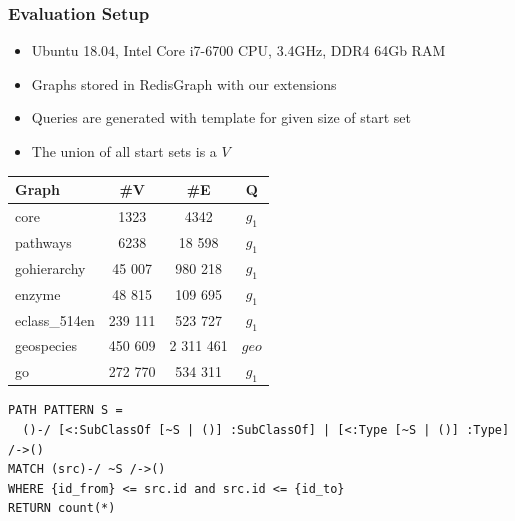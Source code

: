 \documentclass[xcolor=table,aspectratio=169]{beamer}
\begin{document}
\begin{frame}[fragile] \frametitle{Evaluation Setup}

\begin{minipage}[t]{0.51\textwidth}
\vspace{-2cm}
\begin{itemize}
  \item Ubuntu 18.04, Intel Core i7-6700 CPU, 3.4GHz, DDR4 64Gb RAM
  \item Graphs stored in RedisGraph with our extensions
  \item Queries are generated with template for given size of start set
  \item The union of all start sets is a $V$ 
\end{itemize}

\end{minipage}
\begin{minipage}[t]{0.44\textwidth}
{
\begin{tabular}{|l|c|c|c|}
\hline
Graph                  & \#V                  & \#E                  & Q     \\
              
\hline
\hline
core                   & 1323                 & 4342                 & $g_1$ \\
pathways               & 6238                 & 18 598               & $g_1$ \\
gohierarchy            & 45 007               & 980 218              & $g_1$ \\
enzyme                 & 48 815               & 109 695              & $g_1$ \\
eclass\_514en          & 239 111              & 523 727              & $g_1$ \\
geospecies             & 450 609              & 2 311 461            & $geo$ \\
go                     & 272 770              & 534 311              & $g_1$ \\
\hline
\end{tabular}
}

\end{minipage}

\vspace{1cm}

\begin{verbatim}
PATH PATTERN S = 
  ()-/ [<:SubClassOf [~S | ()] :SubClassOf] | [<:Type [~S | ()] :Type] /->()
MATCH (src)-/ ~S /->()
WHERE {id_from} <= src.id and src.id <= {id_to}
RETURN count(*)

\end{verbatim}


\end{frame}
\end{document}
